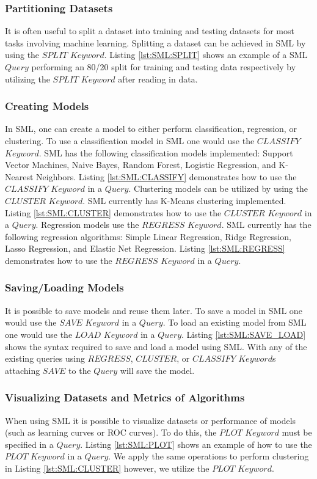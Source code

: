 \subsubsection{Partitioning Datasets}
It is often useful to split a dataset into training and testing datasets for most tasks involving machine learning.  Splitting a dataset can be achieved in SML by using the \(SPLIT\) \(Keyword\).  Listing \ref{lst:SML:SPLIT} shows an example of a SML \(Query\) performing an 80/20 split for training and testing data respectively by utilizing the \(SPLIT\) \(Keyword\) after reading in data.

\subsubsection{Creating Models}

In SML,  one can create a model to either perform classification, regression, or clustering. To use a classification model in SML one would use the \(CLASSIFY\) \(Keyword\). SML has the following classification models implemented: Support Vector Machines, Naive Bayes, Random Forest, Logistic Regression, and K-Nearest Neighbors.  Listing \ref{lst:SML:CLASSIFY} demonstrates how to use the \(CLASSIFY\) \(Keyword\) in a \(Query\).  Clustering models can be utilized by using the \(CLUSTER\) \(Keyword\).  SML currently has K-Means clustering implemented.  Listing \ref{lst:SML:CLUSTER} demonstrates how to use the \(CLUSTER\) \(Keyword\) in a \(Query\).  Regression models use the \(REGRESS\) \(Keyword\).  SML currently has the following regression algorithms: Simple Linear Regression, Ridge Regression, Lasso Regression, and Elastic Net Regression. Listing \ref{lst:SML:REGRESS} demonstrates how to use the \(REGRESS\) \(Keyword\) in a \(Query\).


\subsubsection{Saving/Loading Models}
It is possible to save models and reuse them later. To save a model in SML one would use the \(SAVE\) \(Keyword\) in a \(Query\). To load an existing model from SML one would use the \(LOAD\) \(Keyword\) in a \(Query\).  Listing \ref{lst:SML:SAVE_LOAD} shows the syntax required to save and load a model using SML.  With any of the existing queries using \(REGRESS\),  \(CLUSTER\),  or \(CLASSIFY\) \(Keyword\)s attaching \(SAVE\) to the \(Query\) will save the model. 

\subsubsection{Visualizing Datasets and Metrics of Algorithms}
When using SML it is possible to visualize datasets or performance of models (such as learning curves or ROC curves).  To do this, the \(PLOT\) \(Keyword\) must be specified in a \(Query\).  Listing \ref{lst:SML:PLOT} shows an example of how to use the \(PLOT\) \(Keyword\) in a \(Query\).  We apply the same operations to perform clustering in Listing \ref{lst:SML:CLUSTER} however, we utilize the \(PLOT\) \(Keyword\).

